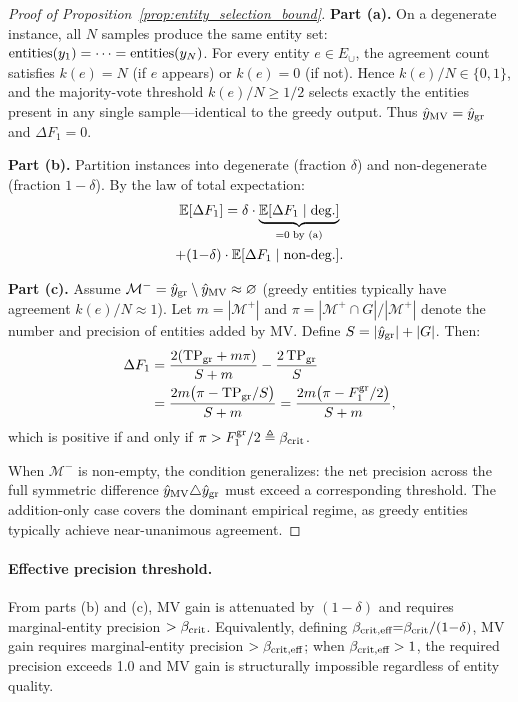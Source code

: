 \begin{proof}[Proof of Proposition~\ref{prop:entity_selection_bound}]
\textbf{Part (a).} On a degenerate instance, all $N$ samples produce the same entity set: $\textup{entities}(y_1) = \cdots = \textup{entities}(y_N)$. For every entity $e \in E_\cup$, the agreement count satisfies $k(e) = N$ (if $e$ appears) or $k(e) = 0$ (if not). Hence $k(e)/N \in \{0,1\}$, and the majority-vote threshold $k(e)/N \geq 1/2$ selects exactly the entities present in any single sample---identical to the greedy output. Thus $\hat{y}_{\textup{MV}} = \hat{y}_{\textup{gr}}$ and $\Delta F_1 = 0$.

\textbf{Part (b).} Partition instances into degenerate (fraction $\delta$) and non-degenerate (fraction $1{-}\delta$). By the law of total expectation:
\begin{multline*}
\mathbb{E}[\Delta F_1] = \delta \cdot \underbrace{\mathbb{E}[\Delta F_1 \mid \textup{deg.}]}_{= 0 \;\textup{by (a)}} \\
+ (1{-}\delta) \cdot \mathbb{E}[\Delta F_1 \mid \textup{non-deg.}].
\end{multline*}

\textbf{Part (c).} Assume $\mathcal{M}^- = \hat{y}_{\textup{gr}} \setminus \hat{y}_{\textup{MV}} \approx \varnothing$ (greedy entities typically have agreement $k(e)/N \approx 1$). Let $m = |\mathcal{M}^+|$ and $\pi = |\mathcal{M}^+ \cap G|/|\mathcal{M}^+|$ denote the number and precision of entities added by MV. Define $S = |\hat{y}_{\textup{gr}}| + |G|$. Then:
\begin{align*}
\Delta F_1 &= \frac{2(\textup{TP}_{\textup{gr}} + m\pi)}{S + m} - \frac{2\,\textup{TP}_{\textup{gr}}}{S} \\
&= \frac{2m\bigl(\pi - \textup{TP}_{\textup{gr}}/S\bigr)}{S + m}
= \frac{2m\bigl(\pi - F_1^{\textup{gr}}/2\bigr)}{S + m},
\end{align*}
which is positive if and only if $\pi > F_1^{\textup{gr}}/2 \triangleq \beta_{\textup{crit}}$.

When $\mathcal{M}^-$ is non-empty, the condition generalizes: the net precision across the full symmetric difference $\hat{y}_{\textup{MV}} \triangle \hat{y}_{\textup{gr}}$ must exceed a corresponding threshold. The addition-only case covers the dominant empirical regime, as greedy entities typically achieve near-unanimous agreement.
\end{proof}

\paragraph{Effective precision threshold.}
From parts (b) and (c), MV gain is attenuated by $(1{-}\delta)$ and requires marginal-entity precision $> \beta_{\textup{crit}}$.
Equivalently, defining $\beta_{\textup{crit,eff}} {=} \beta_{\textup{crit}} / (1{-}\delta)$, MV gain requires marginal-entity precision $> \beta_{\textup{crit,eff}}$; when $\beta_{\textup{crit,eff}} > 1$, the required precision exceeds 1.0 and MV gain is structurally impossible regardless of entity quality.

